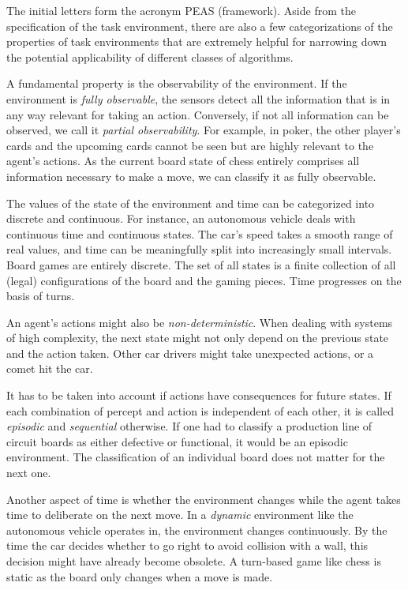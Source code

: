 The initial letters form the acronym PEAS (framework). Aside from the specification of the task environment, there are also a few categorizations of the properties of task environments that are extremely helpful for narrowing down the potential applicability of different classes of algorithms.

A fundamental property is the observability of the environment. If the environment is \textit{fully observable}, the sensors detect all the information that is in any way relevant for taking an action. Conversely, if not all information can be observed, we call it \textit{partial observability}. For example, in poker, the other player's cards and the upcoming cards cannot be seen but are highly relevant to the agent's actions. As the current board state of chess entirely comprises all information necessary to make a move, we can classify it as fully observable.

The values of the state of the environment and time can be categorized into discrete and continuous. For instance, an autonomous vehicle deals with continuous time and continuous states. The car's speed takes a smooth range of real values, and time can be meaningfully split into increasingly small intervals. Board games are entirely discrete. The set of all states is a finite collection of all (legal) configurations of the board and the gaming pieces. Time progresses on the basis of turns.

An agent's actions might also be \textit{non-deterministic}. When dealing with systems of high complexity, the next state might not only depend on the previous state and the action taken. Other car drivers might take unexpected actions, or a comet hit the car.

It has to be taken into account if actions have consequences for future states. If each combination of percept and action is independent of each other, it is called \textit{episodic} and \textit{sequential} otherwise. If one had to classify a production line of circuit boards as either defective or functional, it would be an episodic environment. The classification of an individual board does not matter for the next one.

Another aspect of time is whether the environment changes while the agent takes time to deliberate on the next move. In a \textit{dynamic} environment like the autonomous vehicle operates in, the environment changes continuously. By the time the car decides whether to go right to avoid collision with a wall, this decision might have already become obsolete. A turn-based game like chess is static as the board only changes when a move is made.

